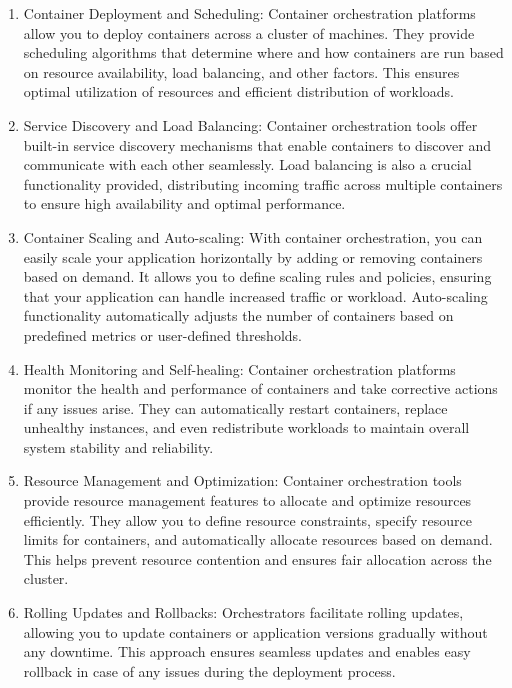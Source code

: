 \begin{enumerate}
    \item Container Deployment and Scheduling: Container orchestration platforms allow you to deploy containers across a cluster of machines. They provide scheduling algorithms that determine where and how containers are run based on resource availability, load balancing, and other factors. This ensures optimal utilization of resources and efficient distribution of workloads.

    \item Service Discovery and Load Balancing: Container orchestration tools offer built-in service discovery mechanisms that enable containers to discover and communicate with each other seamlessly. Load balancing is also a crucial functionality provided, distributing incoming traffic across multiple containers to ensure high availability and optimal performance.

    \item Container Scaling and Auto-scaling: With container orchestration, you can easily scale your application horizontally by adding or removing containers based on demand. It allows you to define scaling rules and policies, ensuring that your application can handle increased traffic or workload. Auto-scaling functionality automatically adjusts the number of containers based on predefined metrics or user-defined thresholds.

    \item Health Monitoring and Self-healing: Container orchestration platforms monitor the health and performance of containers and take corrective actions if any issues arise. They can automatically restart containers, replace unhealthy instances, and even redistribute workloads to maintain overall system stability and reliability.

    \item Resource Management and Optimization: Container orchestration tools provide resource management features to allocate and optimize resources efficiently. They allow you to define resource constraints, specify resource limits for containers, and automatically allocate resources based on demand. This helps prevent resource contention and ensures fair allocation across the cluster.

    \item Rolling Updates and Rollbacks: Orchestrators facilitate rolling updates, allowing you to update containers or application versions gradually without any downtime. This approach ensures seamless updates and enables easy rollback in case of any issues during the deployment process.


\end{enumerate}
